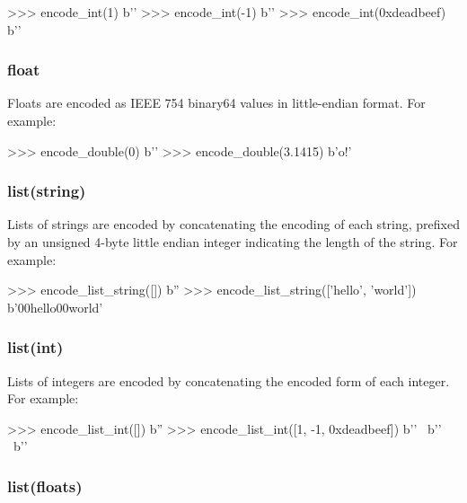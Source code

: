 \begin{pythoncode}
>>> encode_int(1)
b''
>>> encode_int(-1)
b'\xff\xff\xff\xff\xff\xff\xff\xff'
>>> encode_int(0xdeadbeef)
b'\xef\xbe\xad\xde{}'
\end{pythoncode}

\subsubsection{float}

Floats are encoded as IEEE 754 binary64 values in little-endian format.  For
example:

\begin{pythoncode}
>>> encode_double(0)
b''
>>> encode_double(3.1415)
b'o\xca!\t@'
\end{pythoncode}

\subsubsection{list(string)}

Lists of strings are encoded by concatenating the encoding of each string,
prefixed by an unsigned 4-byte little endian integer indicating the length of
the string.  For example:

\begin{pythoncode}
>>> encode_list_string([])
b''
>>> encode_list_string(['hello', 'world'])
b'\x00hello\x00world'
\end{pythoncode}

\subsubsection{list(int)}

Lists of integers are encoded by concatenating the encoded form of each integer.
For example:

\begin{pythoncode}
>>> encode_list_int([])
b''
>>> encode_list_int([1, -1, 0xdeadbeef])
b'' \
b'\xff\xff\xff\xff\xff\xff\xff\xff' \
b'\xef\xbe\xad\xde{}'
\end{pythoncode}

\subsubsection{list(floats)}


